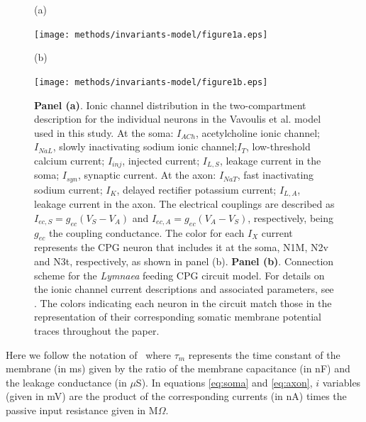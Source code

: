 \begin{figure}
\centering
\begin{minipage}[t]{0.45\textwidth}
	\raggedright
	(a) \par
	\vspace{75pt}
	\texttt{[image: methods/invariants-model/figure1a.eps]}
\end{minipage}\hfill
\begin{minipage}[t]{0.45\textwidth}
	\raggedright
	(b) \par
	\texttt{[image: methods/invariants-model/figure1b.eps]}
\end{minipage}
	\caption{\textbf{Panel (a)}. Ionic channel distribution in the two-compartment description for the individual neurons in the Vavoulis et al. model \cite{Vavoulis2007} used in this study. At the soma: $I_{ACh}$, acetylcholine ionic channel; $I_{NaL}$, slowly inactivating sodium
		ionic channel;$I_T$, low-threshold calcium current; $I_{inj}$, injected current; $I_{L,S}$, leakage current in the soma; $I_{syn}$, synaptic current. At the axon: $I_{NaT}$, fast inactivating sodium current; $I_K$, delayed rectifier potassium current; $I_{L,A}$, leakage current in the axon. The electrical couplings are described as $I_{ec,S}=g_{ec}(V_S-V_A)$ and $I_{ec,A}=g_{ec}(V_A-V_S)$, respectively, being $g_{ec}$ the coupling conductance. The color for each $I_X$ current represents the CPG neuron that includes it at the soma,  N1M, N2v and N3t, respectively, as shown in panel (b). 
		\textbf{Panel (b)}. Connection scheme for the {\sl Lymnaea} feeding CPG circuit model. For details on the ionic channel current descriptions and associated parameters, see \cite{Vavoulis2007}. The colors indicating each neuron in the circuit match those in the representation of their corresponding somatic membrane potential traces throughout the paper. 
	}
	\label{fig:CPG diagram 2 compartments}
\end{figure}

\vspace{0.3in}

\noindent Here we follow the notation of~\cite{Vavoulis2007} where $\tau_m$ represents the time constant of the membrane (in ms) given by the ratio of the membrane capacitance (in nF) and the leakage conductance (in $\mu$S).  In equations \ref{eq:soma} and \ref{eq:axon}, $i$ variables (given in mV) are the product of the corresponding currents (in nA) times the passive input resistance given in M$\Omega$.

